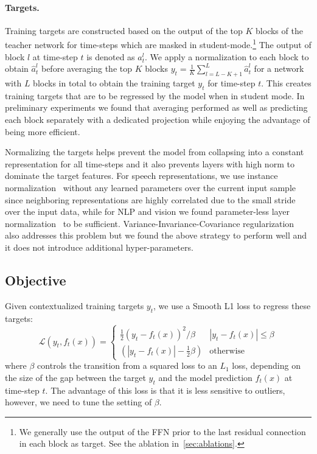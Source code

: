 \documentclass[nohyperref]{article}
\theoremstyle{plain}
\theoremstyle{definition}
\theoremstyle{remark}
\begin{document}
\paragraph{Targets.}
Training targets are constructed based on the output of the top $K$ blocks of the teacher network for time-steps which are masked in student-mode.\footnote{
We generally use the output of the FFN prior to the last residual connection in each block as target.
See the ablation in~\textsection\ref{sec:ablations}.
}
The output of block $l$ at time-step $t$ is denoted as $a_t^l$. 
We apply a normalization to each block to obtain $\hat{a}_t^l$ before averaging the top $K$ blocks $y_t = \frac{1}{K} \sum_{l=L-K+1}^L \hat{a}_t^l$ for a network with $L$ blocks in total to obtain the training target $y_t$ for time-step $t$.
This creates training targets that are to be regressed by the model when in student mode.
In preliminary experiments we found that averaging performed as well as predicting each block separately with a dedicated projection while enjoying the advantage of being more efficient.

Normalizing the targets helps prevent the model from collapsing into a constant representation for all time-steps and it also prevents layers with high norm to dominate the target features.
For speech representations, we use instance normalization~\citep{ulyanov2016in} without any learned parameters over the current input sample since neighboring representations are highly correlated due to the small stride over the input data, while for NLP and vision we found parameter-less layer normalization~\citep{ba2016layer} to be sufficient.
Variance-Invariance-Covariance regularization~\citep{bardes2021vicreg} also addresses this problem but we found the above strategy to perform well and it  does not introduce additional hyper-parameters.




\subsection{Objective}

Given contextualized training targets $y_t$, we use a Smooth L1 loss to regress these targets:
\begin{equation}
\mathcal{L}(y_t, f_t(x)) = 
\begin{cases}
\frac{1}{2} (y_t - f_t(x))^2/\beta & | y_t - f_t(x) | \leq \beta \\
(|y_t-f_t(x)|-\frac{1}{2}\beta) & \text{otherwise}
\end{cases}
\nonumber
\end{equation}
where $\beta$ controls the transition from a squared loss to an $L_1$ loss, depending on the size of the gap between the target $y_t$ and the model prediction $f_t(x)$ at time-step $t$. 
The advantage of this loss is that it is less sensitive to outliers, however, we need to tune the setting of $\beta$. 
\end{document}
